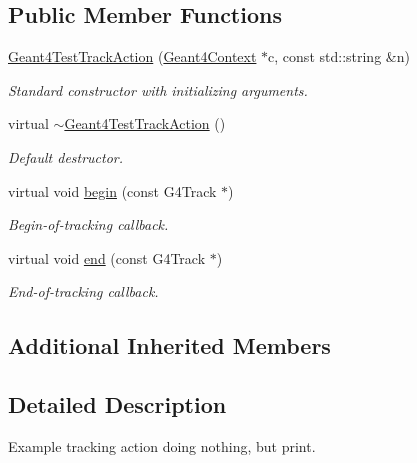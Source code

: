 \subsection*{Public Member Functions}
\begin{DoxyCompactItemize}
\item 
\hyperlink{class_d_d4hep_1_1_simulation_1_1_test_1_1_geant4_test_track_action_a5dcd49bcdb620730e97cb2f6b3c3cd0d}{Geant4\+Test\+Track\+Action} (\hyperlink{class_d_d4hep_1_1_simulation_1_1_geant4_context}{Geant4\+Context} $\ast$c, const std\+::string \&n)
\begin{DoxyCompactList}\small\item\em Standard constructor with initializing arguments. \end{DoxyCompactList}\item 
virtual \hyperlink{class_d_d4hep_1_1_simulation_1_1_test_1_1_geant4_test_track_action_aede90b2245482e02e82e959b30a1e2df}{$\sim$\+Geant4\+Test\+Track\+Action} ()
\begin{DoxyCompactList}\small\item\em Default destructor. \end{DoxyCompactList}\item 
virtual void \hyperlink{class_d_d4hep_1_1_simulation_1_1_test_1_1_geant4_test_track_action_a461ee9be4bf51bcfac397d093fb55fb8}{begin} (const G4\+Track $\ast$)
\begin{DoxyCompactList}\small\item\em Begin-\/of-\/tracking callback. \end{DoxyCompactList}\item 
virtual void \hyperlink{class_d_d4hep_1_1_simulation_1_1_test_1_1_geant4_test_track_action_a41bc0c1912089342579388ae2c176c69}{end} (const G4\+Track $\ast$)
\begin{DoxyCompactList}\small\item\em End-\/of-\/tracking callback. \end{DoxyCompactList}\end{DoxyCompactItemize}
\subsection*{Additional Inherited Members}


\subsection{Detailed Description}
Example tracking action doing nothing, but print. 

